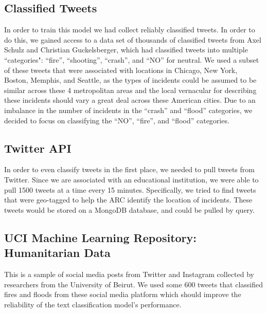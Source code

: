 \documentclass[titlepage, 12pt]{article}
\begin{document}
\subsection{Classified Tweets}
\hspace{0.5 cm}In order to train this model we had collect reliably classified tweets. In order to do this, we gained access to a data set of thousands of classified tweets from Axel Schulz and Christian Guckelsberger, which had classified  tweets into multiple ``categories": ``fire'', ``shooting'', ``crash'', and ``NO'' for neutral. We used a subset of these tweets that were associated with locations in Chicago, New York, Boston, Memphis, and Seattle, as the types of incidents could be assumed to be similar across these 4 metropolitan areas and the local vernacular for describing these incidents should vary a great deal across these American cities. Due to an imbalance in the number of incidents in the ``crash'' and ``flood'' categories, we decided to focus on classifying the ``NO'', ``fire'', and ``flood'' categories.
\citep{CT.2015}

\subsection{Twitter API}
\hspace{0.5 cm}In order to even classify tweets in the first place, we needed to pull tweets from Twitter. Since we are associated with an educational institution, we were able to pull 1500 tweets at a time every 15 minutes. Specifically, we tried to find tweets that were geo-tagged to help the ARC identify the location of incidents. These tweets would be stored on a MongoDB database, and could be pulled by query.

\subsection{UCI Machine Learning Repository: Humanitarian Data}
\hspace{0.5 cm}This is a sample of social media posts from Twitter and Instagram collected by researchers from the University of Beirut. We used some 600 tweets that classified fires and floods from these social media platform which should improve the reliability of the text classification model's performance.
\citep{UCI.2016}
\end{document}
